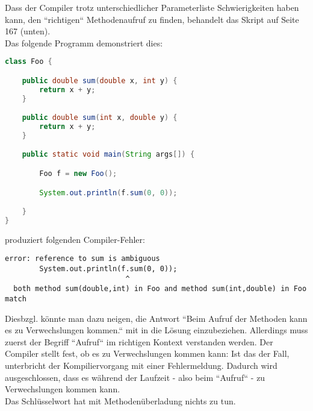 Dass der Compiler trotz unterschiedlicher Parameterliste Schwierigkeiten haben kann, den ``richtigen`` Methodenaufruf zu finden,
behandelt das Skript auf Seite 167 (unten).\\

Das folgende Programm demonstriert dies:

\begin{lstlisting}[language=java]
class Foo {

    public double sum(double x, int y) {
        return x + y;
    }

    public double sum(int x, double y) {
        return x + y;
    }

    public static void main(String args[]) {

        Foo f = new Foo();

        System.out.println(f.sum(0, 0));

    }
}
\end{lstlisting}

produziert folgenden Compiler-Fehler:

\begin{lstlisting}[language=text]
error: reference to sum is ambiguous
        System.out.println(f.sum(0, 0));
                            ^
  both method sum(double,int) in Foo and method sum(int,double) in Foo match
\end{lstlisting}


Diesbzgl. könnte man dazu neigen, die Antwort ``Beim Aufruf der Methoden kann es zu Verwechslungen kommen.`` mit in
die Lösung einzubeziehen.
Allerdings muss zuerst der Begriff ``Aufruf`` im richtigen Kontext verstanden werden. Der Compiler stellt
fest, ob es zu Verwechslungen kommen kann: Ist das der Fall, unterbricht der Kompiliervorgang mit einer Fehlermeldung.
Dadurch wird ausgeschlossen, dass es während der Laufzeit - also beim ``Aufruf`` - zu Verwechslungen kommen kann.\\

Das Schlüsselwort  hat mit Methodenüberladung nichts zu tun.